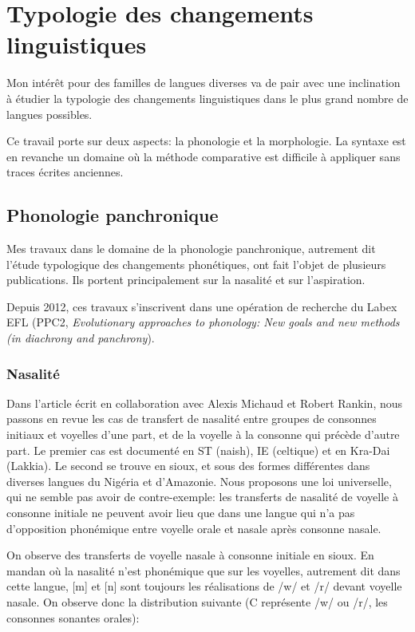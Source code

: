 \documentclass[oldfontcommands,oneside,a4paper,11pt]{memoir}
\begin{document}
\chapter{Typologie des changements linguistiques}

Mon intérêt pour des familles de langues diverses  va de pair avec une inclination à étudier la typologie des changements linguistiques dans le plus grand nombre de langues possibles.

Ce travail porte sur deux aspects: la phonologie et la morphologie. La syntaxe est en revanche un domaine où la méthode comparative est difficile à appliquer sans traces écrites anciennes.


\section{Phonologie panchronique} \label{sec:panchrp}
Mes travaux dans le domaine de la phonologie panchronique, autrement dit l'étude typologique des changements phonétiques, ont fait l'objet de plusieurs publications. Ils portent principalement sur la nasalité et sur l'aspiration.

Depuis 2012, ces travaux s'inscrivent dans une opération de recherche du Labex EFL (PPC2,  \textit{Evolutionary approaches to phonology: New goals and new methods (in diachrony and panchrony}).

\subsection{Nasalité}
Dans l'article \citet{michaud-jacques12nasalite} écrit en collaboration avec Alexis Michaud et Robert Rankin,  nous passons en revue les cas de transfert de nasalité entre groupes de consonnes initiaux et voyelles d'une part, et de la voyelle à la consonne qui précède d'autre part. Le premier cas est documenté en ST (naish), IE (celtique) et en Kra-Dai (Lakkia). Le second se trouve en sioux, et sous des formes différentes dans diverses langues du Nigéria et d'Amazonie. Nous proposons une loi universelle, qui ne semble pas avoir de contre-exemple: les transferts de nasalité de voyelle à consonne initiale ne peuvent avoir lieu que dans une langue qui n'a pas d'opposition phonémique entre voyelle orale et nasale après consonne nasale.

On  observe des transferts de voyelle nasale à consonne initiale en sioux. En mandan où la nasalité n'est phonémique que sur les voyelles, autrement dit dans cette langue, [m] et [n] sont toujours les réalisations de /w/ et /r/ devant voyelle nasale. On observe donc la distribution suivante (C représente  /w/ ou /r/, les consonnes sonantes orales):
\end{document}
